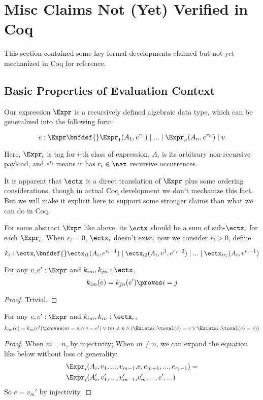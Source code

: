 \section{Misc Claims Not (Yet) Verified in Coq}
\label{sec:misc}

This section contained some key formal developments claimed but not yet mechanized in Coq for reference.

\subsection{Basic Properties of Evaluation Context}

Our expression $\Expr$ is a recursively defined algebraic data type, which can be generalized into the following form:

\[
e : \Expr \bnfdef{} \Expr_1(A_1, e^{r_1}) \mid ... \mid \Expr_n(A_n, e^{r_n}) \mid v
\]

Here, $\Expr_i$ is tag for $i$-th class of expression, $A_i$ is its arbitrary non-recursive payload, and $e^{r_i}$ means
it has $r_i \in \nat$ recursive occurrences.

It is apparent that $\ectx$ is a direct translation of $\Expr$ plus some ordering considerations, though in actual Coq development we don't mechanize this fact.
But we will make it explicit here to support some stronger claims than what we can do in Coq.

For some abstract $\Expr$ like above, its $\ectx$ should be a sum of sub-$\ectx_i$ for each $\Expr_i$. When $r_i = 0$, $\ectx_i$ doesn't exist, now we consider
$r_i > 0$, define

\[
k_i: \ectx_i \bnfdef{} \ectx_{i1}(A_i, e^{r_i - 1}) \mid \ectx_{i2}(A_i, v^1, e^{r_i - 2}) \mid ... \mid \ectx_{ir_i}(A_i, v^{r_i - 1})
\]

\begin{theorem}
For any $e, e': \Expr$ and $k_{im}, k_{jn}: \ectx$,
\[k_{im}(e) = k_{jn}(e') \proves i = j \]
\end{theorem}
\begin{proof} Trivial. \end{proof}

\begin{theorem}
For any $e, e': \Expr$ and $k_{im}, k_{in}: \ectx_i$,
\[k_{im}(e) = k_{in}(e') \proves
 (m = n \land e = e') \lor
 (m \neq n \land (\Exists v. \toval(e) = v \lor \Exists v. \toval(e) = v))\]
\end{theorem}
\begin{proof} 

When $m = n$, by injectivity;
When $m \neq n$, we can expand the equation like below without loss of generality:
\begin{align*}
\Expr_i(A_i, v_1, ..., v_{m - 1}, &e, e_{m + 1}, ..., e_{r_i - 1}) = \\
\Expr_i(A_i', v_1', ..., v_{m - 1}', &v_m', ..., e', ...)
\end{align*}
So $e = v_m'$ by injectivity.
\end{proof}

